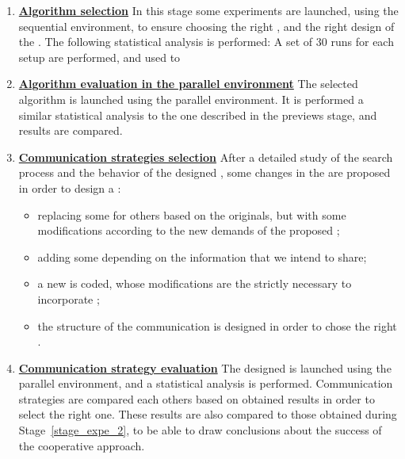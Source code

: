 \begin{enumerate}
\item \underline{\textbf{Algorithm selection}} In this stage some experiments are launched, using the sequential environment, to ensure choosing the right \oms, and the right design of the \as. The following statistical analysis is performed: A set of 30 runs for each setup are performed, and used to 

\item \underline{\textbf{Algorithm evaluation in the parallel environment}} The selected algorithm is launched using the parallel environment. It is performed a similar statistical analysis to the one described in the previews stage, and results are compared.\label{stage_expe_2}

\item \underline{\textbf{Communication strategies selection}} After a detailed study of the search process and the behavior of the designed \sosets, some changes in the \soset{} are proposed in order to design a \commstr:
\begin{itemize}
\item replacing some \oms{} for others based on the originals, but with some modifications according to the new demands of the proposed \commstr;
\item adding some \opchs{} depending on the information that we intend to share;
\item a new \as{} is coded, whose modifications are the strictly necessary to incorporate \opchs;
\item the structure of the communication is designed in order to chose the right \commopers.
\end{itemize}

\item \underline{\textbf{Communication strategy evaluation}} The designed \commstr{} is launched using the parallel environment, and a statistical analysis is performed. Communication strategies are compared each others based on obtained results in order to select the right one. These results are also compared to those obtained during Stage~\ref{stage_expe_2}, to be able to draw conclusions about the success of the cooperative approach.
\end{enumerate}

